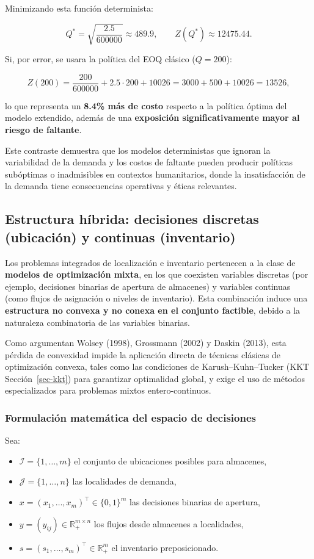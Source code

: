\documentclass[
  spanish,
  us-letterpaper,
]{scrreprt}
\providecommand{\tightlist}{%
  \setlength{\itemsep}{0pt}\setlength{\parskip}{0pt}}
\numberwithin{equation}{section}
\begin{document}
Minimizando esta función determinista:

\[
Q^{\ast}=\sqrt{\frac{2.5}{600000}}\approx489.9,\qquad
Z(Q^{\ast})\approx12475.44.
\]

Si, por error, se usara la política del EOQ clásico (\(Q=200\)):

\[
Z(200)=\frac{200}{600000}+2.5\cdot200+10026
=3000+500+10026=13526,
\]

lo que representa un \textbf{8.4\% más de costo} respecto a la política
óptima del modelo extendido, además de una \textbf{exposición
significativamente mayor al riesgo de faltante}.

Este contraste demuestra que los modelos deterministas que ignoran la
variabilidad de la demanda y los costos de faltante pueden producir
políticas subóptimas o inadmisibles en contextos humanitarios, donde la
insatisfacción de la demanda tiene consecuencias operativas y éticas
relevantes.

\subsection{Estructura híbrida: decisiones discretas (ubicación) y
continuas
(inventario)}\label{estructura-huxedbrida-decisiones-discretas-ubicaciuxf3n-y-continuas-inventario}

Los problemas integrados de localización e inventario pertenecen a la
clase de \textbf{modelos de optimización mixta}, en los que coexisten
variables discretas (por ejemplo, decisiones binarias de apertura de
almacenes) y variables continuas (como flujos de asignación o niveles de
inventario). Esta combinación induce una \textbf{estructura no convexa y
no conexa en el conjunto factible}, debido a la naturaleza combinatoria
de las variables binarias.

Como argumentan Wolsey (1998), Grossmann (2002) y Daskin (2013), esta
pérdida de convexidad impide la aplicación directa de técnicas clásicas
de optimización convexa, tales como las condiciones de
Karush--Kuhn--Tucker (KKT Sección~\ref{sec-kkt}) para garantizar
optimalidad global, y exige el uso de métodos especializados para
problemas mixtos entero-continuos.

\subsubsection{Formulación matemática del espacio de
decisiones}\label{sec-noconvexidad}

Sea:

\begin{itemize}
\tightlist
\item
  \(\mathcal{I} = \{1,\ldots,m\}\) el conjunto de ubicaciones posibles
  para almacenes,
\item
  \(\mathcal{J} = \{1,\ldots,n\}\) las localidades de demanda,
\item
  \(x = (x_1,\dots,x_m)^\top \in \{0,1\}^m\) las decisiones binarias de
  apertura,
\item
  \(y = (y_{ij}) \in \mathbb{R}_+^{m\times n}\) los flujos desde
  almacenes a localidades,
\item
  \(s = (s_1,\dots,s_m)^\top \in \mathbb{R}_+^m\) el inventario
  preposicionado.
\end{itemize}
\end{document}
